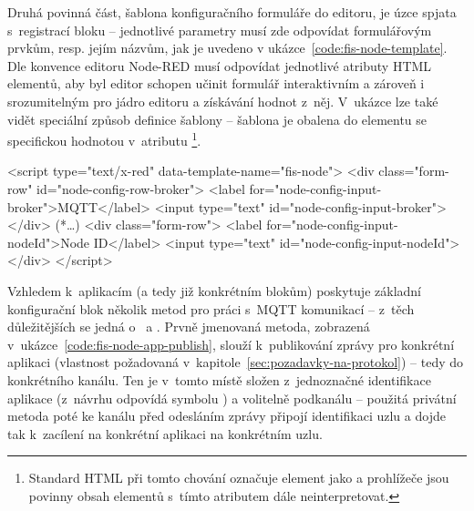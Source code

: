 Druhá povinná část, šablona konfiguračního formuláře do editoru, je úzce spjata s~registrací bloku -- jednotlivé
parametry musí zde odpovídat formulářovým prvkům, resp. jejím názvům, jak je uvedeno v
ukázce~\ref{code:fis-node-template}.
Dle konvence editoru Node-RED musí odpovídat jednotlivé atributy HTML elementů, aby byl editor schopen učinit
formulář interaktivním a zároveň i srozumitelným pro jádro editoru a získávání hodnot z~něj.
V~ukázce lze také vidět speciální způsob definice šablony -- šablona je obalena do elementu  se
specifickou hodnotou v~atributu \footnote{Standard HTML při tomto chování označuje
element  jako  a prohlížeče jsou povinny obsah elementů s~tímto atributem dále
neinterpretovat.}.

\begin{code}[
    language=HTML,
    label=code:fis-node-template,
    caption={Ukázka z~implementace druhé povinné části deklarace bloku -- šablona formuláře v~jazyce HTML obsahuje
    jednotlivé vstupní pro pole pro korespondující parametry definovené v~registraci bloku do editoru
    v~ukázce~\ref{code:fis-node-constructor}.
    Atribut \ic{id="node-config-input-broker"} (a odpovídající) jsou důležité vzhledem k~chování editoru, nutná je shoda
    s~názvem parametru při registraci bloku -- stejně jako správné spárování šablony pomocí atributu
    \ic{data-template-name="fis-node"}.},
]
<script type="text/x-red" data-template-name="fis-node">
    <div class="form-row" id="node-config-row-broker">
        <label for="node-config-input-broker">MQTT</label>
        <input type="text" id="node-config-input-broker">
    </div>
    (*\ldots*)
    <div class="form-row">
        <label for="node-config-input-nodeId">Node ID</label>
        <input type="text" id="node-config-input-nodeId">
    </div>
</script>
\end{code}

Vzhledem k~aplikacím (a tedy již konkrétním blokům) poskytuje základní konfigurační blok několik metod pro práci
s~MQTT komunikací -- z~těch důležitějších se jedná o~ a .
Prvně jmenovaná metoda, zobrazená v~ukázce~\ref{code:fis-node-app-publish}, slouží k~publikování zprávy pro
konkrétní aplikaci (vlastnost požadovaná v~kapitole~\ref{sec:pozadavky-na-protokol}) -- tedy do konkrétního kanálu.
Ten je v~tomto místě složen z~jednoznačné identifikace aplikace  (z~návrhu odpovídá symbolu ) a
volitelně podkanálu -- použitá privátní metoda  poté ke kanálu před odesláním zprávy připojí identifikaci
uzlu a dojde tak k~zacílení na konkrétní aplikaci na konkrétním uzlu.

